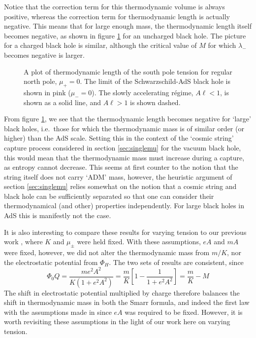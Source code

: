 \documentclass[
twoside,openright,frontopenright]{dmathesis}
\begin{document}
Notice that the correction term for this thermodynamic volume is
always positive, whereas the correction term for thermodynamic 
length is actually negative.
This means that for large enough mass, the thermodynamic length
itself becomes negative, as shown in figure \ref{fig:TDlength} for 
an uncharged black hole. The picture for a charged black hole is 
similar, although the critical value of $M$ for which $\lambda_-$ 
becomes negative is larger.
\begin{figure}
\caption{A plot of thermodynamic length of the south pole tension for regular
north pole, $\mu_+=0$. The limit of the Schwarzschild-AdS black hole is shown
in pink ($\mu_-=0$). The slowly accelerating r\'egime, $A\ell<1$, is shown as a 
solid line, and $A\ell>1$ is shown dashed. 
}
\label{fig:TDlength}
\end{figure}

From figure \ref{fig:TDlength}, we see that the thermodynamic length becomes
negative for `large' black holes, i.e.\ those for which the thermodynamic mass
is of similar order (or higher) than the AdS scale. Setting this in the context
of the `cosmic string' capture process considered in section \ref{sec:singlemu}
for the vacuum black hole, this would mean that the thermodynamic mass must
increase during a capture, as entropy cannot decrease. This seems at first
counter to the notion that the string itself does not carry `ADM' mass, however,
the heuristic argument of section \ref{sec:singlemu} relies somewhat on the
notion that a cosmic string and black hole can be sufficiently separated so that
one can consider their thermodynamical (and other) properties independently. For
large black holes in AdS this is manifestly not the case.

It is also interesting to compare these results for varying tension to our
previous work \cite{Appels:2016uha}, where $K$ and $\mu_\pm$ were held fixed.
With these assumptions, $eA$ and $mA$ were fixed, however, we did not alter the
thermodynamic mass from $m/K$, nor the electrostatic potential from
$\Phi_H$. The two sets of results are consistent, since
\begin{equation}
\Phi_0 Q = \frac{m e^2 A^2}{K(1+e^2 A^2)} 
= \frac{m}{K} \left [ 1 - \frac{1}{1+e^2 A^2} \right] = \frac{m}{K} - M
\end{equation}
The shift in electrostatic potential multiplied by charge therefore balances the
shift in thermodynamic mass in both the Smarr formula, and indeed the first law
with the assumptions made in \cite{Appels:2016uha} since $eA$ was required to be
fixed. However, it is worth revisiting these assumptions in the light of our
work here on varying tension.
\end{document}
